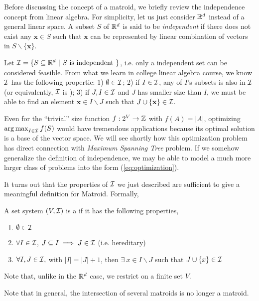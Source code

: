 Before discussing the concept of a matroid, we briefly review the independence concept from linear algebra. For simplicity, let us just consider $\mathbb{R}^d$ instead of a general linear space. A subset $S$ of $\mathbb{R}^d$ is said to be \emph{independent} if there does not exist any $\mathbf{x}\in S$ such that $\mathbf{x}$ can be represented by linear combination of vectors in $S\backslash\{\mathbf{x}\}$. 

Let $\mathcal{I} = \{S \subseteq \mathbb{R}^d~|~S ~\text{is independent}~\}$, i.e. only a independent set can be considered feasible. From what we learn in college linear algebra course, we know $\mathcal{I}$ has the following propertie: 1) $\emptyset \in \mathcal{I}$; 2) if $I\in \mathcal{I}$, any of $I$'s subsets is also in $\mathcal{I}$ (or equivalently, $\mathcal{I}$ is ); 3) if $J, I\in \mathcal{I}$ and $J$ has smaller size than $I$, we must be able to find an element  $\mathbf{x} \in I\backslash J$ such that $J\cup \{\mathbf{x}\} \in \mathcal{I}$. 

Even for the ``trivial'' size function $f: 2^V \rightarrow \mathbb{Z}$ with $f(A) = |A|$, optimizing $\operatorname*{arg\,max}_{I\in\mathcal{I}} f(S)$ would have tremendous applications because its optimal solution is a base of the vector space. We will see shortly how this optimization problem has direct connection with \emph{Maximum Spanning Tree} problem. If we somehow generalize the definition of independence, we may be able to model a much more larger class of problems into the form (\ref{eq:optimization}). 

It turns out that the properties of $\mathcal{I}$ we just described are sufficient to give a meaningful definition for Matroid. Formally, 
\begin{definition}[Matroid]
\label{def:matroid}
  A set system $(V, \mathcal{I})$ is a  if it has the following properties,
  \begin{enumerate}
  \item $\emptyset \in \mathcal{I}$
  \item $\forall I \in \mathcal{I}$, $J\subseteq I \implies J\in \mathcal{I}$ (i.e. hereditary)
  \item $\forall I, J \in \mathcal{I},$ with $|I| = |J| + 1$,  then $\exists~ x\in I\backslash J$ such that $J \cup \{x\}\in \mathcal{I}$ 
  \end{enumerate} 
\end{definition}
Note that, unlike in the $\mathbb{R}^d$ case, we restrict on a finite set $V$.

Note that in general, the intersection of several matroids is no longer a matroid.



